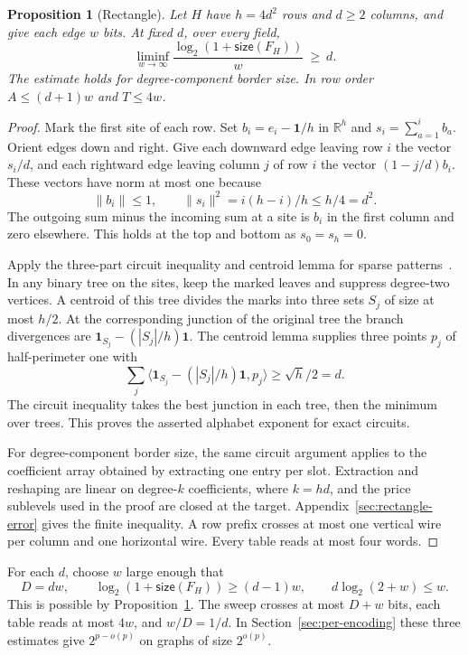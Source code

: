 \documentclass[11pt]{article}
\newtheorem{proposition}[theorem]{Proposition}
\theoremstyle{definition}
\newcommand{\one}{\mathbf{1}}
\newcommand{\circuit}{\mathsf{size}}
\begin{document}
\begin{proposition}[Rectangle]\label{prop:hard}
Let \(H\) have \(h=4d^2\) rows and \(d\ge2\) columns, and give each edge \(w\) bits. At fixed \(d\), over every field,
\[
 \liminf_{w\to\infty}\frac{\log_2(1+\circuit(F_H))}{w}\ \ge\ d .
\]
The estimate holds for degree-component border size. In row order
\(A\le(d+1)w\) and \(T\le4w\).
\end{proposition}
\begin{proof}
Mark the first site of each row. Set \(b_i=e_i-\one/h\) in \(\mathbb R^h\) and \(s_i=\sum_{a=1}^i b_a\).
Orient edges down and right. Give each downward edge leaving row \(i\) the vector \(s_i/d\), and each rightward edge leaving column \(j\) of row \(i\) the vector \((1-j/d)b_i\). These vectors have norm at most one because
\[
 \|b_i\|\le1,\qquad \|s_i\|^2=i(h-i)/h\le h/4=d^2 .
\]
The outgoing sum minus the incoming sum at a site is \(b_i\) in the first column and zero elsewhere. This holds at the top and bottom as \(s_0=s_h=0\).

Apply the three-part circuit inequality and centroid lemma for sparse patterns~\cite[Section~2]{sparse-patterns}.
In any binary tree on the sites, keep the marked leaves and suppress degree-two vertices. A centroid of this tree divides the marks into three sets \(S_j\) of size at most \(h/2\). At the corresponding junction of the original tree the branch divergences are
\(\one_{S_j}-(|S_j|/h)\one\). The centroid lemma supplies three points \(p_j\) of half-perimeter one with
\[
 \sum_j\langle \one_{S_j}-(|S_j|/h)\one,p_j\rangle\ge \sqrt h/2=d.
\]
The circuit inequality takes the best junction in each tree, then the minimum over trees. This proves the asserted alphabet exponent for exact circuits.

For degree-component border size, the same circuit argument applies to the coefficient array obtained by extracting one entry per slot. Extraction and reshaping are linear on degree-\(k\) coefficients, where \(k=hd\), and the price sublevels used in the proof are closed at the target. Appendix~\ref{sec:rectangle-error} gives the finite inequality. A row prefix crosses at most one vertical wire per column and one horizontal wire. Every table reads at most four words.
\end{proof}

For each \(d\), choose \(w\) large enough that
\begin{equation}\label{eq:rectangle-parameters}
 D=dw,\qquad \log_2(1+\circuit(F_H))\ge(d-1)w,\qquad d\log_2(2+w)\le w .
\end{equation}
This is possible by Proposition~\ref{prop:hard}. The sweep crosses at most \(D+w\) bits, each table reads at most \(4w\), and \(w/D=1/d\). In Section~\ref{sec:per-encoding} these three estimates give \(2^{p-o(p)}\) on graphs of size \(2^{o(p)}\).
\end{document}
